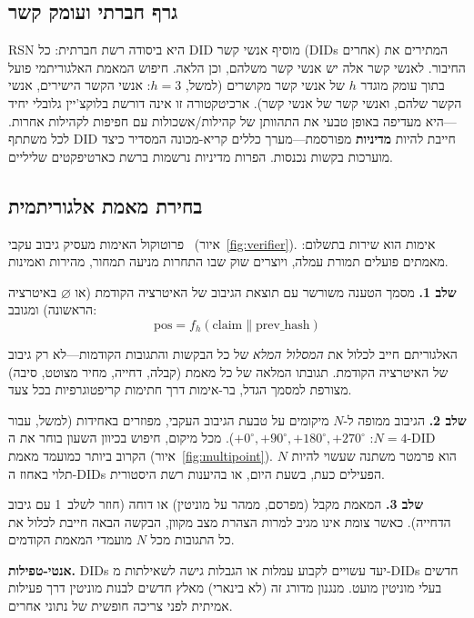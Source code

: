 \documentclass[11pt,a4paper,twocolumn]{article}
\begin{document}
\subsection{גרף חברתי ועומק קשר}

RSN היא ביסודה רשת חברתית: כל DID מוסיף אנשי קשר (DIDs אחרים) המתירים את החיבור. לאנשי קשר אלה יש אנשי קשר משלהם, וכן הלאה. חיפוש המאמת האלגוריתמי פועל בתוך עומק מוגדר $h$ של אנשי קשר מקושרים (למשל, $h=3$: אנשי הקשר הישירים, אנשי הקשר שלהם, ואנשי קשר של אנשי קשר). ארכיטקטורה זו אינה דורשת בלוקצ'יין גלובלי יחיד---היא מעדיפה באופן טבעי את התהוותן של קהילות/אשכולות עם חפיפות לקהילות אחרות. לכל משתתף DID חייבת להיות \textbf{מדיניות} מפורסמת---מערך כללים קריא-מכונה המסדיר כיצד מוערכות בקשות נכנסות. הפרות מדיניות נרשמות ברשת כארטיפקטים שליליים.

\subsection{בחירת מאמת אלגוריתמית}

פרוטוקול האימות מעסיק גיבוב עקבי~\cite{karger1997} (איור~\ref{fig:verifier}). אימות הוא שירות בתשלום: מאמתים פועלים תמורת עמלה, ויוצרים שוק שבו התחרות מניעה תמחור, מהירות ואמינות.

\textbf{שלב 1.} מסמך הטענה משורשר עם תוצאת הגיבוב של האיטרציה הקודמת (או $\varnothing$ באיטרציה הראשונה) ומגובב:
\begin{equation}
\text{pos} = f_h(\text{claim} \| \text{prev\_hash})
\label{eq:hash}
\end{equation}

האלגוריתם חייב לכלול את \emph{המסלול המלא} של כל הבקשות והתגובות הקודמות---לא רק גיבוב של האיטרציה הקודמת. תגובתו המלאה של כל מאמת (קבלה, דחייה, מחיר מצוטט, סיבה) מצורפת למסמך הגדל, בר-אימות דרך חתימות קריפטוגרפיות בכל צעד.

\textbf{שלב 2.} הגיבוב ממופה ל-$N$ מיקומים על טבעת הגיבוב העקבי, מפוזרים באחידות (למשל, עבור $N=4$: $+0^{\circ}, +90^{\circ}, +180^{\circ}, +270^{\circ}$). מכל מיקום, חיפוש בכיוון השעון בוחר את ה-DID הקרוב ביותר כמועמד מאמת (איור~\ref{fig:multipoint}). $N$ הוא פרמטר משתנה שעשוי להיות תלוי באחוז ה-DIDs הפעילים כעת, בשעת היום, או בהיענות רשת היסטורית.

\textbf{שלב 3.} המאמת מקבל (מפרסם, ממהר על מוניטין) או דוחה (חוזר לשלב~1 עם גיבוב הדחייה). כאשר צומת אינו מגיב למרות הצהרת מצב מקוון, הבקשה הבאה חייבת לכלול את כל התגובות מכל $N$ מועמדי המאמת הקודמים.

\textbf{אנטי-טפילות.} DIDs יעד עשויים לקבוע עמלות או הגבלות גישה לשאילתות מ-DIDs חדשים בעלי מוניטין מועט. מנגנון מדורג זה (לא בינארי) מאלץ חדשים לבנות מוניטין דרך פעילות אמיתית לפני צריכה חופשית של נתוני אחרים.
\end{document}
